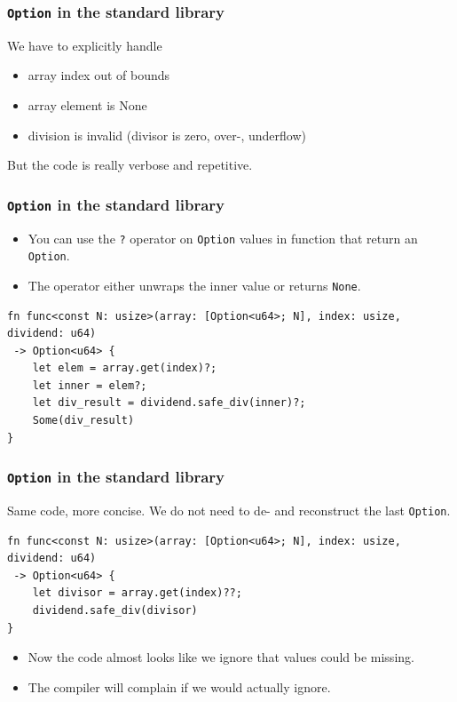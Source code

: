 \begin{frame}[fragile]
    \frametitle{\texttt{Option} in the standard library}
    We have to explicitly handle
    \begin{itemize}
        \item array index out of bounds
        \item array element is None
        \item division is invalid (divisor is zero, over-, underflow)
    \end{itemize}
    \pause
    \vfill
    But the code is really verbose and repetitive.
\end{frame}

\begin{frame}[fragile]
    \frametitle{\texttt{Option} in the standard library}
    \begin{itemize}
        \item You can use the \texttt{?} operator on \texttt{Option} values in function that return an \texttt{Option}.
        \item The operator either unwraps the inner value or returns \texttt{None}.
    \end{itemize}
    \pause
    \vfill
    \begin{verbatim}
fn func<const N: usize>(array: [Option<u64>; N], index: usize, dividend: u64)
 -> Option<u64> {
    let elem = array.get(index)?;
    let inner = elem?;
    let div_result = dividend.safe_div(inner)?;
    Some(div_result)
}
    \end{verbatim}
\end{frame}

\begin{frame}[fragile]
    \frametitle{\texttt{Option} in the standard library}
    Same code, more concise. We do not need to de- and reconstruct the last \texttt{Option}.
    \vfill
    \begin{verbatim}
fn func<const N: usize>(array: [Option<u64>; N], index: usize, dividend: u64)
 -> Option<u64> {
    let divisor = array.get(index)??;
    dividend.safe_div(divisor)
}
    \end{verbatim}
    \pause
    \vfill
    \begin{itemize}
        \item Now the code almost looks like we ignore that values could be missing.
        \item The compiler will complain if we would actually ignore.
    \end{itemize}
\end{frame}


